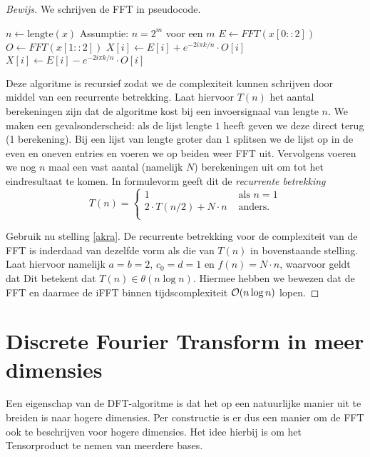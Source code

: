 \begin{proof}[Bewijs]
We schrijven de FFT in pseudocode.

\begin{algorithmic}
\State $n \gets \text{lengte}(x)$ \Comment Assumptie: $n = 2^m$ voor een $m$
\Else
	\State $E \gets FFT(x[0::2])$ 
	\State $O \gets FFT(x[1::2])$ 
			\State $X[i] \gets E[i] + e^{-2i \pi k/n} \cdot O[i]$
		\Else
			\State $X[i] \gets E[i] - e^{-2i \pi k/n} \cdot O[i]$
		\EndIf
	\EndFor
\EndIf
\State {}
\EndFunction
\end{algorithmic}

Deze algoritme is recursief zodat we de complexiteit kunnen schrijven door middel van een recurrente betrekking. Laat hiervoor $T(n)$ het aantal berekeningen zijn dat de algoritme kost bij een invoersignaal van lengte $n$. We maken een gevalsonderscheid: als de lijst lengte $1$ heeft geven we deze direct terug (1 berekening). Bij een lijst van lengte groter dan $1$ splitsen we de lijst op in de even en oneven entries en voeren we op beiden weer FFT uit. Vervolgens voeren we nog $n$ maal een vast aantal (namelijk $N$) berekeningen uit om tot het eindresultaat te komen. In formulevorm geeft dit de \emph{recurrente betrekking}
\[
T(n) = \begin{cases}
    1 &\text{ als } n = 1 \\
    2\cdot T(n/2) + N\cdot n &\text{ anders}. \\
\end{cases}
\]

Gebruik nu stelling \ref{akra}. De recurrente betrekking voor de complexiteit van de FFT is inderdaad van dezelfde vorm als die van $T(n)$ in bovenstaande stelling.
Laat hiervoor namelijk $a=b=2$, $c_0=d=1$ en $f (n) = N\cdot n$, waarvoor geldt dat
Dit betekent dat $T(n) \in \theta(n \log n)$.
Hiermee hebben we bewezen dat de FFT en daarmee de iFFT binnen tijdscomplexiteit $\mathcal{O}(n\log n)$ lopen. 
\end{proof}

\section{Discrete Fourier Transform in meer dimensies}
Een eigenschap van de DFT-algoritme is dat het op een natuurlijke manier uit te breiden is naar hogere dimensies.
Per constructie is er dus een manier om de FFT ook te beschrijven voor hogere dimensies.
Het idee hierbij is om het Tensorproduct te nemen van meerdere bases.

